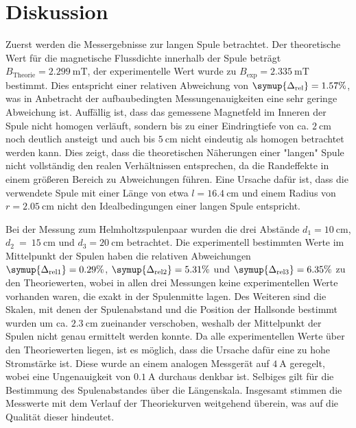 \section{Diskussion}
\label{sec:Diskussion}
Zuerst werden die Messergebnisse zur langen Spule betrachtet. Der theoretische Wert für die magnetische Flussdichte innerhalb der Spule beträgt 
$B_{\text{Theorie}} = 2.299\:\unit{\milli\tesla}$, der experimentelle Wert wurde zu $B_{\text{exp}} = 2.335\:\unit{\milli\tesla}$ bestimmt. 
Dies entspricht einer relativen Abweichung von $\symup{\Delta_{\text{rel}}} = 1.57 \%$, was in Anbetracht der aufbaubedingten Messungenauigkeiten 
eine sehr geringe Abweichung ist. Auffällig ist, dass das gemessene Magnetfeld im Inneren der Spule nicht homogen verläuft, sondern bis zu einer Eindringtiefe von
ca. $2 \: \unit{\centi\metre}$ noch deutlich ansteigt und auch bis $5\: \unit{\centi\metre}$ nicht eindeutig als homogen betrachtet werden kann.
Dies zeigt, dass die theoretischen Näherungen einer "langen"\: Spule nicht vollständig den realen Verhältnissen entsprechen, da die Randeffekte in einem größeren
Bereich zu Abweichungen führen. Eine Ursache dafür ist, dass die verwendete Spule mit einer Länge von etwa $l = 16.4\: \unit{\centi\metre}$ und einem Radius von 
$r = 2.05 \: \unit{\centi\metre}$ nicht den Idealbedingungen einer langen Spule entspricht.


Bei der Messung zum Helmholtzspulenpaar wurden die drei Abstände $d_1 = 10\: \unit{\centi\metre}$, $d_2~=~15\: \unit{\centi\metre}$
und $d_3 = 20\: \unit{\centi\metre}$ betrachtet. Die experimentell bestimmten Werte im Mittelpunkt der Spulen haben die relativen Abweichungen 
$\symup{\Delta_{\text{rel}1}} = 0.29 \%$, $\symup{\Delta_{\text{rel}2}} = 5.31\%$ und $\symup{\Delta_{\text{rel}3}} = 6.35 \%$ zu den Theoriewerten, wobei in allen 
drei Messungen keine experimentellen Werte vorhanden waren, die exakt in der Spulenmitte lagen. Des Weiteren sind die Skalen, mit denen der Spulenabstand und die 
Position der Hallsonde bestimmt wurden um ca. $2.3\: \unit{\centi\metre}$ zueinander verschoben, weshalb der Mittelpunkt der Spulen nicht genau ermittelt werden konnte.
Da alle experimentellen Werte über den Theoriewerten liegen, ist es möglich, dass die Ursache dafür eine zu hohe Stromstärke ist. Diese wurde an einem
analogen Messgerät auf $4 \: \unit{\ampere}$ geregelt, wobei eine Ungenauigkeit von $0.1 \: \unit{\ampere}$ durchaus denkbar ist. Selbiges gilt für die Bestimmung des
Spulenabstandes über die Längenskala. Insgesamt stimmen die Messwerte mit dem Verlauf der Theoriekurven weitgehend überein, was auf die Qualität dieser hindeutet.


